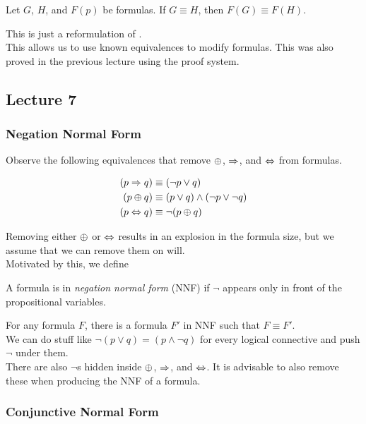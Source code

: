 \begin{theorem}
	Let $G$, $H$, and $F(p)$ be formulas. If $G\equiv H$, then $F(G)\equiv F(H)$.
\end{theorem}
This is just a reformulation of .\\
This allows us to use known equivalences to modify formulas. This was also proved in the previous lecture using the proof system.

\subsection{Lecture 7}

\subsubsection{Negation Normal Form}

Observe the following equivalences that remove $\oplus$, $\Rightarrow$, and $\Leftrightarrow$ from formulas.

\begin{align*}
	(p\Rightarrow q) &\equiv (\neg p\vee q) \\
	(p\oplus q) &\equiv (p\vee q) \wedge (\neg p\vee \neg q) \\
	(p\Leftrightarrow q) &\equiv \neg (p\oplus q)
\end{align*}

Removing either $\oplus$ or $\Leftrightarrow$ results in an explosion in the formula size, but we assume that we can remove them on will.\\
Motivated by this, we define

\begin{definition}
	A formula is in \textit{negation normal form} (NNF) if $\neg$ appears only in front of the propositional variables.
\end{definition}

For any formula $F$, there is a formula $F'$ in NNF such that $F\equiv F'$.\\
We can do stuff like $\neg(p\lor q) = (p\land \neg q)$ for every logical connective and push $\neg$ under them.\\

There are also $\neg$s hidden inside $\oplus$, $\Rightarrow$, and $\Leftrightarrow$. It is advisable to also remove these when producing the NNF of a formula.

\subsubsection{Conjunctive Normal Form}

